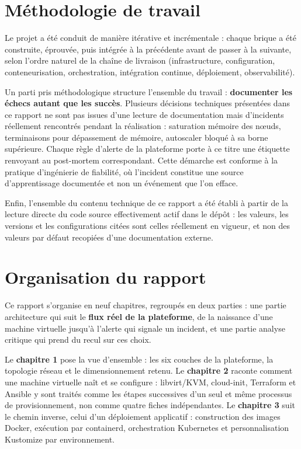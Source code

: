 \documentclass[12pt,a4paper,twoside,openright]{report}
\begin{document}
\section*{Méthodologie de travail}

Le projet a été conduit de manière itérative et incrémentale : chaque brique a été
construite, éprouvée, puis intégrée à la précédente avant de passer à la suivante,
selon l'ordre naturel de la chaîne de livraison (infrastructure, configuration,
conteneurisation, orchestration, intégration continue, déploiement, observabilité).

Un parti pris méthodologique structure l'ensemble du travail : \textbf{documenter les
échecs autant que les succès}. Plusieurs décisions techniques présentées dans ce
rapport ne sont pas issues d'une lecture de documentation mais d'incidents réellement
rencontrés pendant la réalisation : saturation mémoire des n\oe uds, terminaisons
pour dépassement de mémoire, autoscaler bloqué à sa borne supérieure. Chaque règle
d'alerte de la plateforme porte à ce titre une étiquette renvoyant au post-mortem
correspondant. Cette démarche est conforme à la pratique d'ingénierie de fiabilité,
où l'incident constitue une source d'apprentissage documentée et non un événement
que l'on efface.

Enfin, l'ensemble du contenu technique de ce rapport a été établi à partir de la
lecture directe du code source effectivement actif dans le dépôt : les valeurs, les
versions et les configurations citées sont celles réellement en vigueur, et non des
valeurs par défaut recopiées d'une documentation externe.

\section*{Organisation du rapport}

Ce rapport s'organise en neuf chapitres, regroupés en deux parties : une partie
architecture qui suit le \textbf{flux réel de la plateforme}, de la naissance d'une
machine virtuelle jusqu'à l'alerte qui signale un incident, et une partie analyse
critique qui prend du recul sur ces choix.

Le \textbf{chapitre 1} pose la vue d'ensemble : les six couches de la plateforme, la
topologie réseau et le dimensionnement retenu. Le \textbf{chapitre 2} raconte
comment une machine virtuelle naît et se configure : libvirt/KVM, cloud-init,
Terraform et Ansible y sont traités comme les étapes successives d'un seul et même
processus de provisionnement, non comme quatre fiches indépendantes. Le
\textbf{chapitre 3} suit le chemin inverse, celui d'un déploiement applicatif :
construction des images Docker, exécution par containerd, orchestration Kubernetes
et personnalisation Kustomize par environnement.
\end{document}
